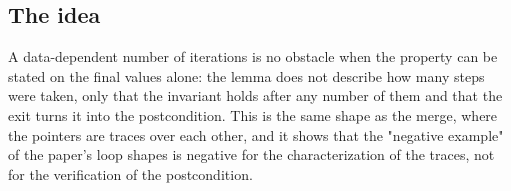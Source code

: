 \subsection{The idea}
A data-dependent number of iterations is no obstacle when the property can be stated on the final values
alone: the lemma does not describe how many steps were taken, only that the invariant holds after any number
of them and that the exit turns it into the postcondition. This is the same shape as the merge, where the
pointers are traces over each other, and it shows that the "negative example" of the paper's loop shapes is
negative for the characterization of the traces, not for the verification of the postcondition.
